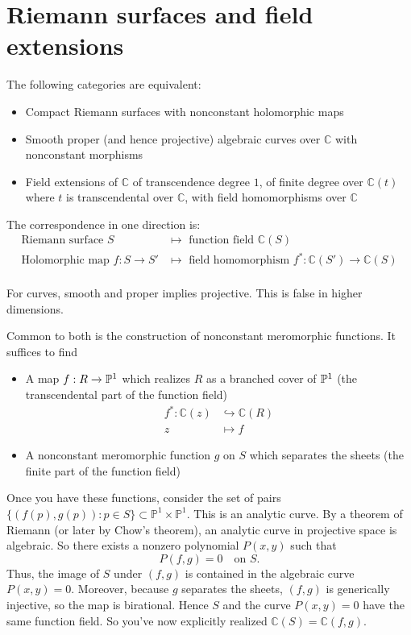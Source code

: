 \documentclass[12pt]{article}
\begin{document}
\section{Riemann surfaces and field extensions}
\begin{theorem}
The following categories are equivalent:
\begin{itemize}
    \item Compact Riemann surfaces with nonconstant holomorphic maps
    \item Smooth proper (and hence projective) algebraic curves over $\mathbb{C}$ with nonconstant morphisms
    \item Field extensions of $\mathbb{C}$ of transcendence degree $1$, of finite degree over $\mathbb{C}(t)$ where $t$ is transcendental over $\mathbb{C}$, with field homomorphisms over $\mathbb{C}$
\end{itemize}

The correspondence in one direction is:
\begin{align*}
    \text{Riemann surface } S &\mapsto \text{ function field } \mathbb{C}(S) \\
    \text{Holomorphic map } f: S \to S' &\mapsto \text{ field homomorphism } f^*: \mathbb{C}(S') \to \mathbb{C}(S) \\
\end{align*}
\end{theorem}

\begin{remark}
    For curves, smooth and proper implies projective. This is false in higher dimensions.
\end{remark}
Common to both is the construction of nonconstant meromorphic functions. It suffices to find \begin{itemize}
    \item A map $f:R \to \P^1$ which realizes $R$ as a branched cover of $\P^1$ (the transcendental part of the function field) \begin{align*}
        f^*: \mathbb{C}(z) &\hookrightarrow \mathbb{C}(R) \\
        z &\mapsto f
    \end{align*}
    \item A nonconstant meromorphic function $g$ on $S$ which separates the sheets (the finite part of the function field)
\end{itemize}
Once you have these functions, consider the set of pairs $\{(f(p), g(p)) : p \in S\} \subset \mathbb{P}^1 \times \mathbb{P}^1$. This is an analytic curve. By a theorem of Riemann (or later by Chow's theorem), an analytic curve in projective space is algebraic. So there exists a nonzero polynomial $P(x,y)$ such that
\[
P(f,g) = 0 \quad \text{on } S.
\]
Thus, the image of $S$ under $(f,g)$ is contained in the algebraic curve $P(x,y)=0$. Moreover, because $g$ separates the sheets, $(f,g)$ is generically injective, so the map is birational. Hence $S$ and the curve $P(x,y)=0$ have the same function field. So you've now explicitly realized $\mathbb{C}(S) = \mathbb{C}(f,g)$.
\end{document}
